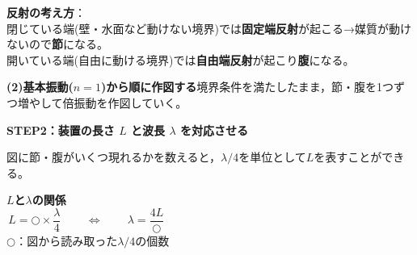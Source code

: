 \documentclass[a4paper,11pt]{ltjsarticle}
\newcommand{\subbanner}[1]{%
  \begin{tcolorbox}[colback=black!85,coltext=white,boxrule=0pt,sharp corners,
    left=6pt,right=6pt,top=3pt,bottom=3pt,before skip=6pt,after skip=5pt]
    {\bfseries #1}
  \end{tcolorbox}}
\begin{document}
\begin{pointbox}
\textbf{反射の考え方}：\\
閉じている端(壁・水面など動けない境界)では\textbf{固定端反射}が起こる→媒質が動けないので\textbf{節}になる。\\
開いている端(自由に動ける境界)では\textbf{自由端反射}が起こり\textbf{腹}になる。
\end{pointbox}

\textbf{(2)基本振動($n=1$)から順に作図する}\quad 境界条件を満たしたまま，節・腹を1つずつ増やして倍振動を作図していく。



\subbanner{STEP2：装置の長さ $L$ と波長 $\lambda$ を対応させる}

図に節・腹がいくつ現れるかを数えると，$\lambda/4$を単位として$L$を表すことができる。
\begin{formulabox}
\begin{center}
\textbf{$L$と$\lambda$の関係}\\[4pt]
$\boxed{\,L = \bigcirc \times \dfrac{\lambda}{4}\,}\qquad\Longleftrightarrow\qquad \boxed{\,\lambda = \dfrac{4L}{\bigcirc}\,}$\\[4pt]
{\footnotesize $\bigcirc$：図から読み取った$\lambda/4$の個数}
\end{center}
\end{formulabox}
\end{document}

